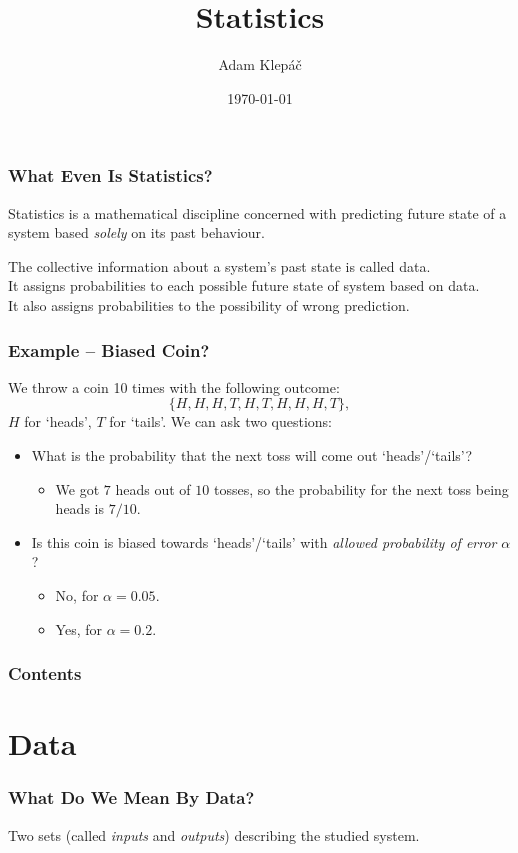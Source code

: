 \documentclass[aspectratio=169,11pt,svgnames]{beamer}
\title{Statistics}
\date{\today}
\author{Adam Klepáč}
\institute[GEVO]{Gymnázium Evolution Jižní Město}
\begin{document}
\titleframe

\begin{frame}
 \frametitle{What Even Is Statistics?}
 \begin{tcolorbox}[title=Statistics]
  \alert{Statistics} is a mathematical discipline concerned with predicting
  future state of a system based \emph{solely} on its past behaviour.
 \end{tcolorbox}
 \pause
 The collective information about a system's past state is called
 \alert{data}.\\
 \pause
 It assigns \alert{probabilities} to each possible future state of system based
 on data.\\
 \pause
 It also assigns probabilities to the \alert{possibility of wrong prediction}.
\end{frame}

\begin{frame}
 \frametitle{Example -- Biased Coin?}
 We throw a coin 10 times with the following outcome:
 \[
  \{H,H,H,T,H,T,H,H,H,T\},
 \]
 $H$ for `heads', $T$ for `tails'.
 \pause
 We can ask two questions:
 \pause
 \begin{itemize}[label=\textbullet]
  \item<3-> What is the probability that the \alert{next toss} will come out
   `heads'/`tails'?
  \begin{itemize}[label=\textminus]
   \item<5-> We got $7$ heads out of $10$ tosses, so the probability for the next toss
    being heads is $7 / 10$.
  \end{itemize}
  \item<4-> Is this coin is \alert{biased towards} `heads'/`tails' with
   \emph{allowed probability of error} $\alpha$?
   \begin{itemize}[label=\textminus]
    \item<6-> \alert{No}, for $\alpha = 0.05$.
    \item<6-> \alert{Yes}, for $\alpha = 0.2$.
   \end{itemize}
 \end{itemize}
\end{frame}

\begin{frame}
 \frametitle{Contents}
 \tableofcontents
\end{frame}

\section{Data}

\begin{frame}
 \frametitle{What Do We Mean By Data?}
 \begin{tcolorbox}[title=Data]
  \alert{Two sets} (called \emph{inputs} and \emph{outputs}) describing the
  studied system.
 \end{tcolorbox}
\end{frame}
\end{document}
